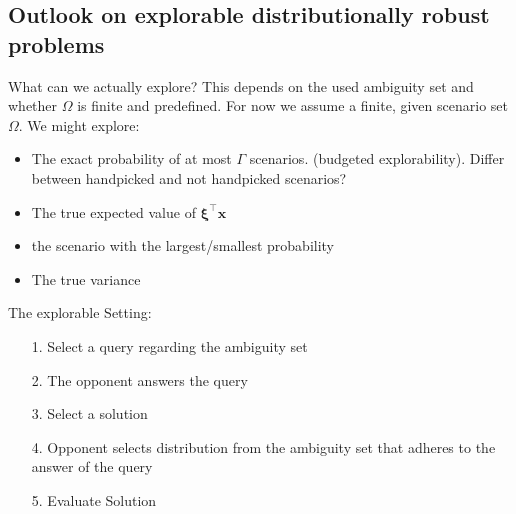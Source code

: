 \documentclass[a4paper,abstracton]{scrartcl}
\begin{document}
\subsection{Outlook on explorable distributionally robust problems}
What can we actually explore? This depends on the used ambiguity set and whether $\Omega$ is finite and predefined. For now we assume a finite, given scenario set $\Omega$. We might explore:
\begin{itemize}
\item The exact probability of at most $\Gamma$ scenarios. (budgeted explorability). Differ between handpicked and not handpicked scenarios?
\item The true expected value of $\pmb{\xi}^\top \pmb{x}$
\item the scenario with the largest/smallest probability
\item The true variance 
\end{itemize}
The explorable Setting:
\begin{itemize}
\item[1.] Select a query regarding the ambiguity set
\item[2.] The opponent answers the query
\item[3.] Select a solution
\item[4.] Opponent selects distribution from the ambiguity set that adheres to the answer of the query
\item[5.] Evaluate Solution
\end{itemize}



\end{document}
